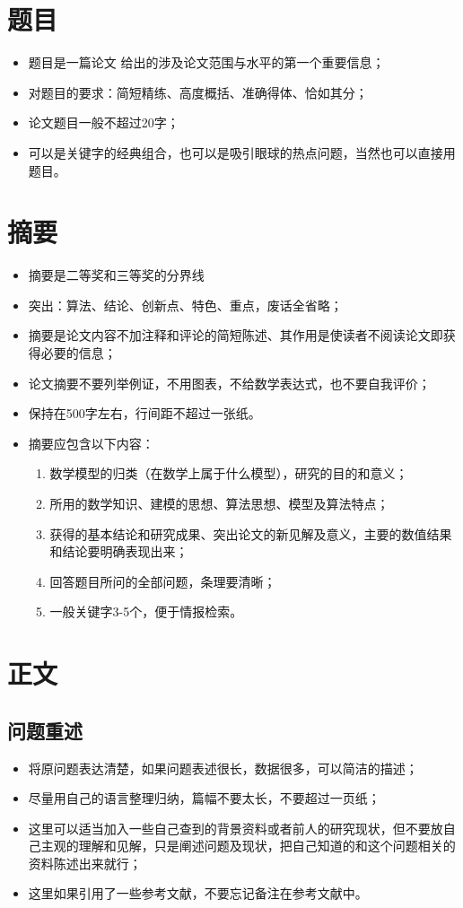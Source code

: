 \documentclass[openany]{progbookcn}
\begin{document}
\section{题目}
\begin{itemize}
    \item 题目是一篇论文 给出的涉及论文范围与水平的第一个重要信息；
    \item 对题目的要求：简短精练、高度概括、准确得体、恰如其分；
    \item 论文题目一般不超过20字；
    \item 可以是关键字的经典组合，也可以是吸引眼球的热点问题，当然也可以直接用题目。
\end{itemize}
\section{摘要}
\begin{itemize}
    \item 摘要是二等奖和三等奖的分界线
    \item 突出：算法、结论、创新点、特色、重点，废话全省略；
    \item 摘要是论文内容不加注释和评论的简短陈述、其作用是使读者不阅读论文即获得必要的信息；
    \item 论文摘要不要列举例证，不用图表，不给数学表达式，也不要自我评价；
    \item 保持在500字左右，行间距不超过一张纸。
    \item 摘要应包含以下内容：
    \begin{enumerate}[itemindent=1em]
        \item 数学模型的归类（在数学上属于什么模型），研究的目的和意义；
        \item 所用的数学知识、建模的思想、算法思想、模型及算法特点；
        \item 获得的基本结论和研究成果、突出论文的新见解及意义，主要的数值结果和结论要明确表现出来；
        \item 回答题目所问的全部问题，条理要清晰；
        \item 一般关键字3-5个，便于情报检索。
    \end{enumerate}
\end{itemize}
\section{正文}
\subsection{问题重述}
\begin{itemize}
    \item 将原问题表达清楚，如果问题表述很长，数据很多，可以简洁的描述；
    \item 尽量用自己的语言整理归纳，篇幅不要太长，不要超过一页纸；
    \item 这里可以适当加入一些自己查到的背景资料或者前人的研究现状，但不要放自己主观的理解和见解，只是阐述问题及现状，把自己知道的和这个问题相关的资料陈述出来就行；
    \item 这里如果引用了一些参考文献，不要忘记备注在参考文献中。
\end{itemize}
\end{document}
